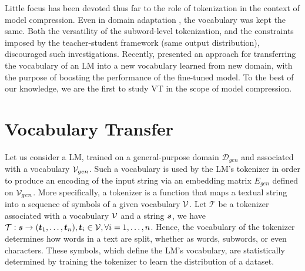\documentclass[11pt]{article}
\def\Bs{\mbox{\boldmath $s$}}
\def\Bt{\mbox{\boldmath $t$}}
\def\tok{\mathcal{T}}
\def\domgen{\mathcal{D}_{gen}}
\begin{document}
Little focus has been devoted thus far to the role of tokenization in the context of model compression. Even in domain adaptation \cite{gordon-duh-2020-distill}, the vocabulary was kept the same. Both the versatility of the subword-level tokenization, and the constraints imposed by the teacher-student framework (same output distribution), discouraged such investigations. Recently, \citet{samenko2021fine} presented an approach for transferring the vocabulary of an LM into a new vocabulary learned from new domain, with the purpose of boosting the performance of the fine-tuned model. To the best of our knowledge, we are the first to study VT in the scope of model compression.





\section{Vocabulary Transfer}
\label{sec:methodology}
% 
Let us consider a LM, trained on a general-purpose domain $\domgen$ and associated with a vocabulary ${\cal V}_{gen}$. Such a vocabulary is used by the LM's tokenizer in order to produce an encoding of the input string via an embedding matrix $E_{gen}$ defined on ${\cal V}_{gen}$. More specifically, a tokenizer is a function that maps a textual string into a sequence of symbols of a given vocabulary ${\cal V}$. Let $\tok$ be a tokenizer associated with a vocabulary ${\cal V}$ and a string $\Bs$, we have  $\tok: \Bs \rightarrow (\Bt_1, \ldots, \Bt_n), \Bt_i \in {\cal V},  \forall i=1,\ldots,n$. Hence, the vocabulary of the tokenizer determines how words in a text are split, whether as words, subwords, or even characters. These symbols, which define the LM's vocabulary, are statistically determined by training the tokenizer to learn the distribution of a dataset.
\end{document}
